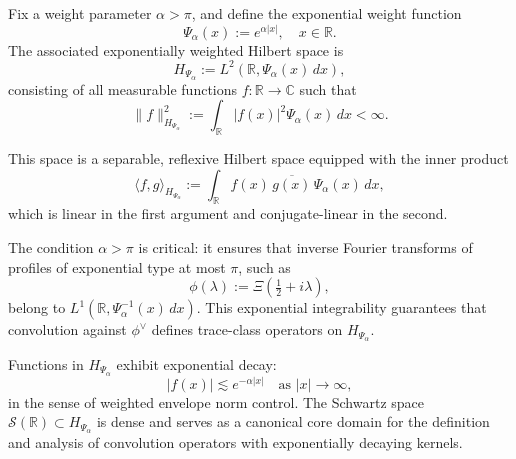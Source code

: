 \begin{definition}
\label{def:weighted_fourier_space}
Fix a weight parameter \( \alpha > \pi \), and define the exponential weight function
\[
\Psi_\alpha(x) := e^{\alpha |x|}, \quad x \in \mathbb{R}.
\]
The associated exponentially weighted Hilbert space is
\[
H_{\Psi_\alpha} := L^2(\mathbb{R}, \Psi_\alpha(x)\, dx),
\]
consisting of all measurable functions \( f \colon \mathbb{R} \to \mathbb{C} \) such that
\[
\|f\|_{H_{\Psi_\alpha}}^2 := \int_{\mathbb{R}} |f(x)|^2 \Psi_\alpha(x)\, dx < \infty.
\]

This space is a separable, reflexive Hilbert space equipped with the inner product
\[
\langle f, g \rangle_{H_{\Psi_\alpha}} := \int_{\mathbb{R}} f(x)\, \overline{g(x)}\, \Psi_\alpha(x)\, dx,
\]
which is linear in the first argument and conjugate-linear in the second.

\medskip

The condition \( \alpha > \pi \) is critical: it ensures that inverse Fourier transforms of profiles of exponential type at most \( \pi \), such as
\[
\phi(\lambda) := \Xi\left( \tfrac{1}{2} + i\lambda \right),
\]
belong to \( L^1(\mathbb{R}, \Psi_\alpha^{-1}(x)\, dx) \). This exponential integrability guarantees that convolution against \( \phi^\vee \) defines trace-class operators on \( H_{\Psi_\alpha} \).

\medskip

Functions in \( H_{\Psi_\alpha} \) exhibit exponential decay:
\[
|f(x)| \lesssim e^{-\alpha |x|} \quad \text{as } |x| \to \infty,
\]
in the sense of weighted envelope norm control. The Schwartz space \( \mathcal{S}(\mathbb{R}) \subset H_{\Psi_\alpha} \) is dense and serves as a canonical core domain for the definition and analysis of convolution operators with exponentially decaying kernels.
\end{definition}
